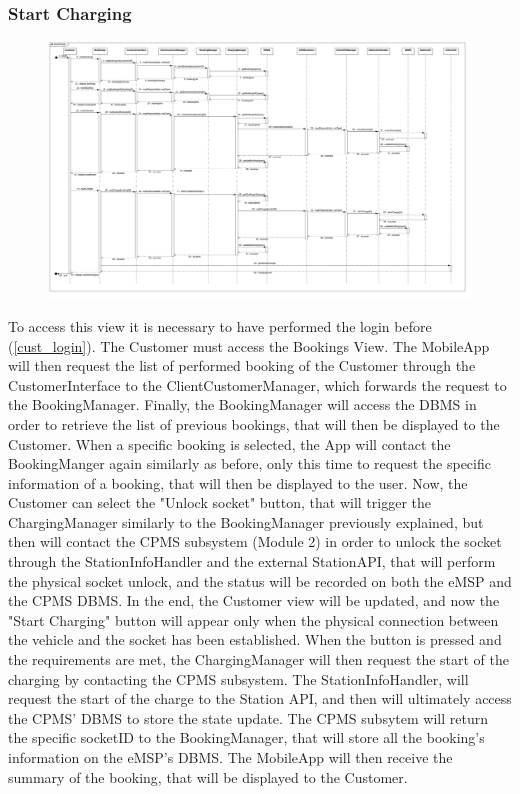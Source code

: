 \subsubsection{Start Charging}\label{start_charge}
\begin{figure}[H]
    \begin{center}
        \includegraphics[width=\textwidth]{img/runtime/start_charge}
    \end{center}
\end{figure}
To access this view it is necessary to have performed the login before (\ref{cust_login}). The Customer must access the Bookings View. The MobileApp will then request the list of performed booking of the Customer through the CustomerInterface to the ClientCustomerManager, which forwards the request to the BookingManager. Finally, the BookingManager will access the DBMS in order to retrieve the list of previous bookings, that will then be displayed to the Customer. When a specific booking is selected, the App will contact the BookingManger again similarly as before, only this time to request the specific information of a booking, that will then be displayed to the user. Now, the Customer can select the "Unlock socket" button, that will trigger the ChargingManager similarly to the BookingManager previously explained, but then will contact the CPMS subsystem (Module 2) in order to unlock the socket through the StationInfoHandler and the external StationAPI, that will perform the physical socket unlock, and the status will be recorded on both the eMSP and the CPMS DBMS. In the end, the Customer view will be updated, and now the "Start Charging" button will appear only when the physical connection between the vehicle and the socket has been established. When the button is pressed and the requirements are met, the ChargingManager will then request the start of the charging by contacting the CPMS subsystem. The StationInfoHandler, will request the start of the charge to the Station API, and then will ultimately access the CPMS' DBMS to store the state update. The CPMS subsytem will return the specific socketID to the BookingManager, that will store all the booking's information on the eMSP's DBMS. The MobileApp will then receive the summary of the booking, that will be displayed to the Customer.
